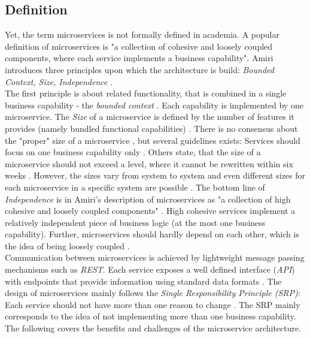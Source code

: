 \subsection{Definition}
Yet, the term microservices is not formally defined in academia. A popular definition of microservices is  "a collection of cohesive and loosely coupled components, where each service implements a business capability"\cite{ObjectAwareAmiri}.
Amiri introduces three principles upon which the architecture is build: \textit{Bounded Context, Size, Independence} \cite{ObjectAwareAmiri}. \\
The first principle is about related functionality, that is combined in a single business capability - the  \textit{bounded context} \cite{FunctionalDecompositionHeinrich}. Each capability is implemented by one microservice. 
The \textit{Size} of a microservice is defined by the number of features it provides (namely bundled functional capabilities)  \cite{WorkloadbasedClustering}. There is no consensus about the "proper" size of a microservice \cite{DomainEngineeringMunezero}, but several guidelines exists: Services should focus on one business capability only \cite{ObjectAwareAmiri}. Others state, that the size of a microservice should not exceed a level, where it cannot be rewritten within six weeks \cite{WorkloadbasedClustering}. However, the sizes vary from system to system \cite{FunctionalDecompositionHeinrich} and even different sizes for each microservice in a specific system are possible \cite{DomainEngineeringMunezero}. The bottom line of \textit{Independence} is in Amiri's description of microservices as "a collection of high cohesive and loosely coupled components" \cite{ObjectAwareAmiri}. High cohesive services implement a relatively independent piece of business logic (at the most one business capability). Further, microservices should hardly depend on each other, which is the idea of being loosely coupled \cite{DataflowDrivenChen}.\\
Communication between microservices is achieved by lightweight message passing mechanisms such as \textit{REST}. Each service exposes a well defined interface (\textit{API}) with endpoints that provide information using standard data formats \cite{FunctionalDecompositionHeinrich}. 
The design of microservices mainly follows the \textit{Single Responsibility Principle (SRP)}: Each service should not have more than one reason to change \cite{TowardsUnderstandingEvolution}. The SRP mainly corresponds to the idea of not implementing more than one business capability.
The following covers the benefits and challenges of the microservice architecture.





